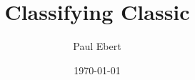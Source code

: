 \documentclass{article}
\begin{document}
\title{Classifying Classic}

\author{Paul Ebert}

\date{\today}

\maketitle

\tableofcontents












\end{document}
